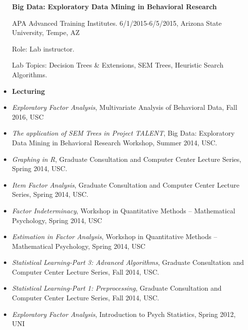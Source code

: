\documentclass[letterpaper,10pt]{article}
\begin{document}
\begin{itemize}
%
\begin{center}
	\parbox{6.5in}{\textbf{Big Data: Exploratory Data Mining in Behavioral Research}}
	\parbox{6.5in}{APA Advanced Training Institutes. 6/1/2015-6/5/2015, Arizona State University, Tempe, AZ}
	\parbox{6.5in}{Role: Lab instructor.}
	\parbox{6.5in}{Lab Topics: Decision Trees \& Extensions, SEM Trees, Heuristic Search Algorithms.}
\end{center}

\item {\textbf{\large{Lecturing}}}

\item[] \emph{Exploratory Factor Analysis}, Multivariate Analysis of Behavioral Data, Fall 2016, USC\\
\item[] \emph{The application of SEM Trees in Project TALENT}, Big Data: Exploratory Data Mining in Behavioral Research Workshop, Summer 2014, USC.
\item[] \emph{Graphing in R}, Graduate Consultation and Computer Center Lecture Series, Spring 2014, USC.
\item[] \emph{Item Factor Analysis}, Graduate Consultation and Computer Center Lecture Series, Spring 2014, USC.
\item[] \emph{Factor Indeterminacy}, Workshop in Quantitative Methods -- Mathematical Psychology, Spring 2014, USC\\
\item[] \emph{Estimation in Factor Analysis}, Workshop in Quantitative Methods -- Mathematical Psychology, Spring 2014, USC\\
\item[] \emph{Statistical Learning-Part 3: Advanced Algorithms}, Graduate Consultation and Computer Center Lecture Series, Fall 2014, USC.
\item[] \emph{Statistical Learning-Part 1: Preprocessing}, Graduate Consultation and Computer Center Lecture Series, Fall 2014, USC.
\item[] \emph{Exploratory Factor Analysis}, Introduction to Psych Statistics, Spring 2012, UNI\\




\end{itemize}
\end{document}
